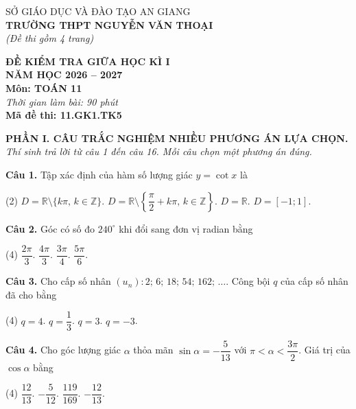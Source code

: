 \documentclass[12pt, a4paper]{article}
\newcommand{\cau}[1]{\vspace{0.12cm}\noindent\textbf{Câu #1. }}
\newcommand{\PhanI}{
\vspace{0.25cm}
\noindent\textbf{\large\sffamily PHẦN I. CÂU TRẮC NGHIỆM NHIỀU PHƯƠNG ÁN LỰA CHỌN.}
\textit{Thí sinh trả lời từ câu 1 đến câu 16. Mỗi câu chọn một phương án đúng.}\par\vspace{0.2cm}
}
\begin{document}
\noindent
\begin{minipage}[t]{0.52\textwidth}
\centering
SỞ GIÁO DỤC VÀ ĐÀO TẠO AN GIANG\\
\textbf{TRƯỜNG THPT NGUYỄN VĂN THOẠI}\\
\makebox[\linewidth][c]{\rule{4cm}{0.5pt}}\vspace{2mm}
\textit{(Đề thi gồm 4 trang)}
\end{minipage}
\hfill
\begin{minipage}[t]{0.45\textwidth}
\centering
\textbf{ĐỀ KIỂM TRA GIỮA HỌC KÌ I}\\
\textbf{NĂM HỌC 2026 -- 2027}\\
\textbf{Môn: TOÁN 11}\\
\textit{Thời gian làm bài: 90 phút}\\
\makebox[\linewidth][c]{\rule{4cm}{0.5pt}}\vspace{2mm}
\textbf{Mã đề thi: 11.GK1.TK5}
\end{minipage}
\vspace{0.3cm}

\PhanI

\cau{1} Tập xác định của hàm số lượng giác $y = \cot x$ là
\begin{tasks}(2)
\task $D = \mathbb{R}\setminus\{k\pi,\, k\in\mathbb{Z}\}$.
\task $D = \mathbb{R}\setminus\left\{\dfrac{\pi}{2} + k\pi,\, k\in\mathbb{Z}\right\}$.
\task $D = \mathbb{R}$.
\task $D = [-1; 1]$.
\end{tasks}

\cau{2} Góc có số đo $240^\circ$ khi đổi sang đơn vị radian bằng
\begin{tasks}(4)
\task $\dfrac{2\pi}{3}$.
\task $\dfrac{4\pi}{3}$.
\task $\dfrac{3\pi}{4}$.
\task $\dfrac{5\pi}{6}$.
\end{tasks}

\cau{3} Cho cấp số nhân $(u_n)\colon 2;\, 6;\, 18;\, 54;\, 162;\,\dots$. Công bội $q$ của cấp số nhân đã cho bằng
\begin{tasks}(4)
\task $q = 4$.
\task $q = \dfrac{1}{3}$.
\task $q = 3$.
\task $q = -3$.
\end{tasks}

\cau{4} Cho góc lượng giác $\alpha$ thỏa mãn $\sin\alpha = -\dfrac{5}{13}$ với $\pi < \alpha < \dfrac{3\pi}{2}$. Giá trị của $\cos\alpha$ bằng
\begin{tasks}(4)
\task $\dfrac{12}{13}$.
\task $-\dfrac{5}{12}$.
\task $\dfrac{119}{169}$.
\task $-\dfrac{12}{13}$.
\end{tasks}
\end{document}
